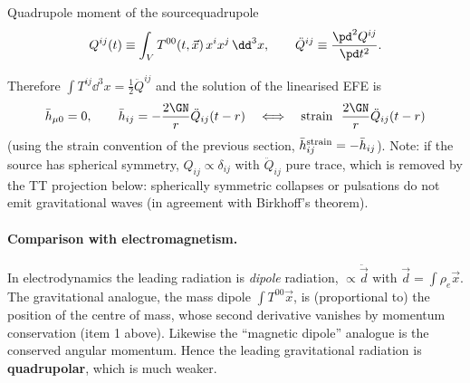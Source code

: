 \begin{definition}{Quadrupole moment of the source}{quadrupole}
\begin{equation}
  Q^{ij}(t)\equiv\int_VT^{00}(t,\vec x)\,x^ix^j\,\dd^3x ,\qquad\ddot Q^{ij}\equiv\frac{\pd^2Q^{ij}}{\pd t^2}.
\end{equation}
\end{definition}
Therefore $\int T^{ij}\dd^3x=\frac12\ddot Q^{ij}$ and the solution of the linearised EFE is
\begin{equation}
  \bar h_{\mu0}=0,\qquad\bar h_{ij}=-\frac{2\GN}{r}\ddot Q_{ij}(t-r)\quad\Longleftrightarrow\quad\text{strain}\ \ \frac{2\GN}{r}\ddot Q_{ij}(t-r)
\end{equation}
(using the strain convention of the previous section, $\bar h^{\rm strain}_{ij}=-\bar h_{ij}$). Note: if the source has spherical symmetry, $Q_{ij}\propto\delta_{ij}$ with $\ddot Q_{ij}$ pure trace, which is removed by the TT projection below: spherically symmetric collapses or pulsations do not emit gravitational waves (in agreement with Birkhoff's theorem).

\paragraph{Comparison with electromagnetism.} In electrodynamics the leading radiation is \emph{dipole} radiation, $\propto\ddot{\vec d}$ with $\vec d=\int\rho_e\vec x$. The gravitational analogue, the mass dipole $\int T^{00}\vec x$, is (proportional to) the position of the centre of mass, whose second derivative vanishes by momentum conservation (item 1 above). Likewise the ``magnetic dipole'' analogue is the conserved angular momentum. Hence the leading gravitational radiation is \textbf{quadrupolar}, which is much weaker.

